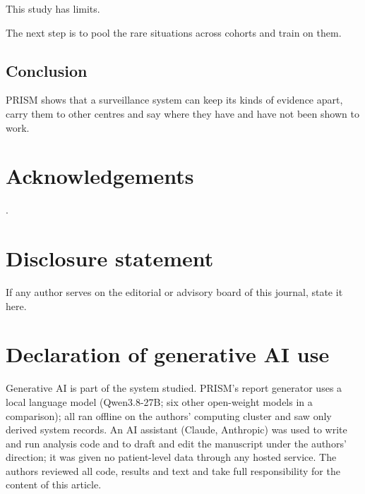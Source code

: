 \documentclass[largeformat]{interact} %
\begin{document}
This study has limits.

The next step is to pool the rare situations across cohorts and train on them.

\subsection*{Conclusion}

PRISM shows that a surveillance system can keep its kinds of evidence apart, carry them to other centres and say
where they have and have not been shown to work.

\section*{Acknowledgements}
.

\section*{Disclosure statement}
 If any author serves on the editorial or advisory board of this journal, state it here.

\section*{Declaration of generative AI use}
 Generative AI is part of the system studied. PRISM's report generator uses
a local language model (Qwen3.8-27B; six other open-weight models in a comparison); all ran offline on the authors'
computing cluster and saw only derived system records. An AI assistant (Claude, Anthropic) was used to write and run
analysis code and to draft and edit the manuscript under the authors' direction; it was given no patient-level
data through any hosted service. The authors reviewed all code, results and text and take full responsibility for
the content of this article.
\end{document}
